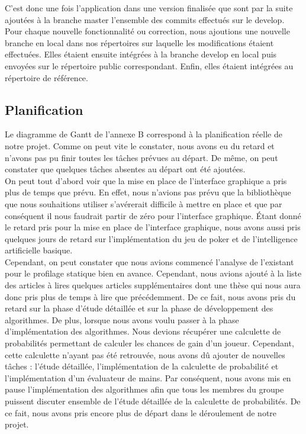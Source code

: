 \documentclass{report}
\begin{document}
C'est donc une fois l'application dans une version finalisée que sont par la suite ajoutées à la branche master l'ensemble des commits effectués sur le develop.\\

Pour chaque nouvelle fonctionnalité ou correction, nous ajoutions une nouvelle branche en local dans nos répertoires sur laquelle les modifications étaient effectuées. Elles étaient ensuite intégrées à la branche develop en local puis envoyées sur le répertoire public correspondant. Enfin, elles étaient intégrées au répertoire de référence.\par

\subsection{Planification}
\hspace{0.5cm}Le diagramme de Gantt de l'annexe B correspond à la planification réelle de notre projet. Comme on peut vite le constater, nous avons eu du retard et n'avons pas pu finir toutes les tâches prévues au départ. De même, on peut constater que quelques tâches absentes au départ ont été ajoutées.\\

On peut tout d'abord voir que la mise en place de l'interface graphique a pris plus de temps que prévu. En effet, nous n'avions pas prévu que la bibliothèque que nous souhaitions utiliser s’avérerait difficile à mettre en place et que par conséquent il nous faudrait partir de zéro pour l'interface graphique. Étant donné le retard pris pour la mise en place de l'interface graphique, nous avons aussi pris quelques jours de retard sur l'implémentation du jeu de poker et de l'intelligence artificielle basique. \\

Cependant, on peut constater que nous avions commencé l'analyse de l'existant pour le profilage statique bien en avance. Cependant, nous avions ajouté à la liste des articles à lires quelques articles supplémentaires dont une thèse qui nous aura donc pris plus de temps à lire que précédemment. De ce fait, nous avons pris du retard sur la phase d'étude détaillée et sur la phase de développement des algorithmes. De plus, lorsque nous avons voulu passer à la phase d'implémentation des algorithmes. Nous devions récupérer une calculette de probabilités permettant de calculer les chances de gain d'un joueur. Cependant, cette calculette n'ayant pas été retrouvée, nous avons dû ajouter de nouvelles tâches : l'étude détaillée, l'implémentation de la calculette de probabilité et l'implémentation d'un évaluateur de mains. Par conséquent, nous avons mis en pause l'implémentation des algorithmes afin que tous les membres du groupe puissent discuter ensemble de l'étude détaillée de la calculette de probabilités. De ce fait, nous avons pris encore plus de départ dans le déroulement de notre projet. \\
\end{document}
